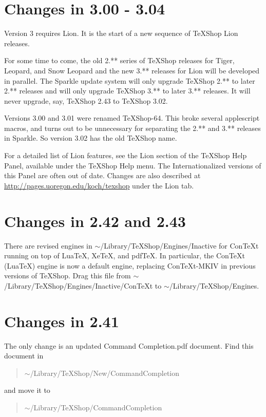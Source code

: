 \documentclass[11pt, oneside]{amsart}
\begin{document}
\section{Changes in 3.00 - 3.04}

Version 3 requires Lion. It is the start of a new sequence of TeXShop Lion releases. 

For some time to come, the old 2.** series of TeXShop releases for Tiger, Leopard, and Snow Leopard and the new 3.** releases for Lion
will be developed in parallel. The Sparkle update
system will only upgrade TeXShop 2.** to later 2.** releases and will only upgrade TeXShop 3.** to later 3.** releases. It will never upgrade, say, TeXShop 2.43 to
TeXShop 3.02.

Versions 3.00 and 3.01 were renamed TeXShop-64. This broke several applescript macros, and turns out to be unnecessary for separating the 2.** and 3.** releases in Sparkle. So version 3.02 has the old TeXShop name. 

For a detailed list of Lion features, see the Lion section of the TeXShop Help Panel, available under the TeXShop Help menu. The Internationalized versions of
this Panel are often out of date. Changes are also described at \url{http://pages.uoregon.edu/koch/texshop} under the Lion tab.

\section{Changes in 2.42 and 2.43}
There are revised engines in $\sim$/Library/TeXShop/Engines/Inactive for ConTeXt running on top of LuaTeX, XeTeX, and pdfTeX.
In particular, the ConTeXt (LuaTeX) engine is now a default engine, replacing ConTeXt-MKIV in previous versions of TeXShop. Drag this file
from $\sim$/Library/TeXShop/Engines/Inactive/ConTeXt to $\sim$/Library/TeXShop/Engines.



\section{Changes in 2.41}

The only change is an updated Command Completion.pdf document. Find this document in
\begin{quotation}
 $\sim$/Library/TeXShop/New/CommandCompletion
 \end{quotation}  and move it to  \begin{quotation}$\sim$/Library/TeXShop/CommandCompletion\end{quotation}
\end{document}
